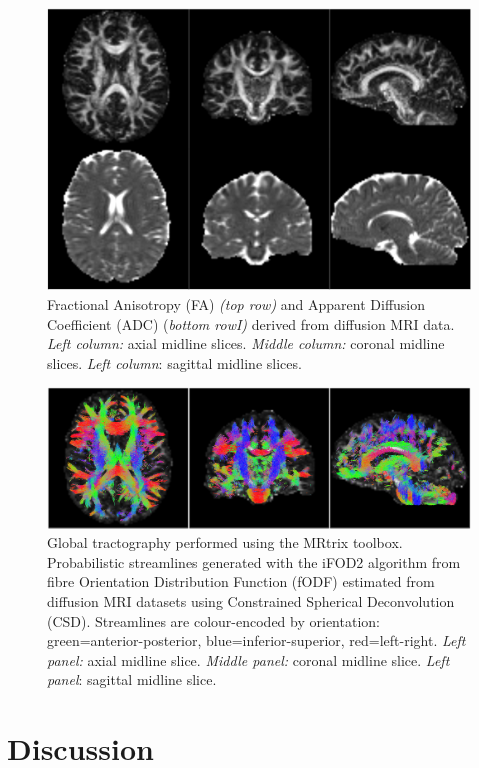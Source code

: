 \documentclass[smallextended]{svjour3}       %
\begin{document}
\begin{figure}
    \centering
    \includegraphics[width=\textwidth]{../figures/fa_adc}
  \caption{Fractional Anisotropy (FA) \emph{(top row)} and
Apparent Diffusion Coefficient (ADC) (\emph{bottom rowI)} derived from
diffusion MRI data. \emph{Left column:} axial midline slices.
\emph{Middle column:} coronal midline slices. \emph{Left column}:
sagittal midline slices.}
\label{fig:fa_adc}
\end{figure}


\begin{figure}
    \centering
    \includegraphics[width=\textwidth]{../figures/tractography}
  \caption{Global tractography performed using the MRtrix
toolbox. Probabilistic streamlines generated with the iFOD2 algorithm
from fibre Orientation Distribution Function (fODF) estimated from
diffusion MRI datasets using Constrained Spherical Deconvolution (CSD).
Streamlines are colour-encoded by orientation: green=anterior-posterior,
blue=inferior-superior, red=left-right. \emph{Left panel:} axial midline
slice. \emph{Middle panel:} coronal midline slice. \emph{Left panel}:
sagittal midline slice.}
\label{fig:tractography}
\end{figure}

\section*{Discussion}
\label{discussion}
\end{document}

